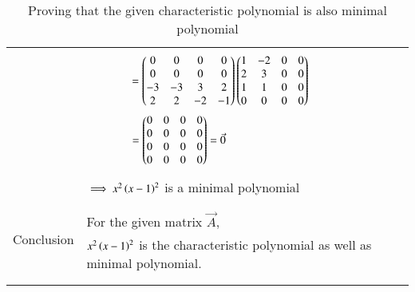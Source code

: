 \documentclass[journal,12pt]{IEEEtran}
\begin{document}
\begin{longtable}{|c|l|}
	&\\
	& $\qquad\qquad=\begin{pmatrix}0&0&0&0\\0&0&0&0\\-3&-3&3&2\\2&2&-2&-1\end{pmatrix}\begin{pmatrix}1&-2&0&0\\2&3&0&0\\1&1&0&0\\0&0&0&0\end{pmatrix}$\\
	& $\qquad\qquad = \begin{pmatrix}0&0&0&0\\0&0&0&0\\0&0&0&0\\0&0&0&0\end{pmatrix}=\Vec{0}$\\
	&\\
	&$\implies x^2\left(x-1\right)^2$ is a minimal polynomial\\
	&\\
	\hline
	\multirow{3}{*}{Conclusion} & \\
	& For the given matrix $\Vec{A}$,\\
	&$x^2\left(x-1\right)^2$ is the characteristic polynomial as well as minimal polynomial.\\
	&\\
	\hline
	\caption{Proving that the given characteristic polynomial is also minimal polynomial}
    \label{table:2}
\end{longtable}
\end{document}
